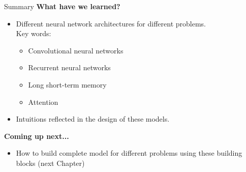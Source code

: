 

\begin{frame}{Summary}
\textbf{What have we learned?}
\begin{itemize}
\item Different neural network architectures for different problems.\\ Key words:
\begin{itemize}
\item Convolutional neural networks
\item Recurrent neural networks
\item Long short-term memory
\item Attention
\end{itemize}
\item Intuitions reflected in the design of these models.
\end{itemize}
\vsp
\textbf{Coming up next...}
\begin{itemize}
\item How to build complete model for different problems using these building blocks (next Chapter)
\end{itemize}
\end{frame}
